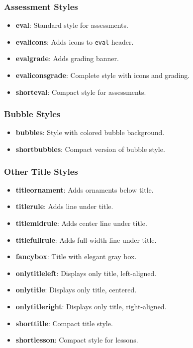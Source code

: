 \documentclass[
    margin=2cm
]{neoschool}
\begin{document}
\subsubsection{Assessment Styles}

\begin{itemize}
\item
  \textbf{eval}: Standard style for assessments.
\end{itemize}


\begin{itemize}
\item
  \textbf{evalicons}: Adds icons to \texttt{eval}
  header.
\item
  \textbf{evalgrade}: Adds grading banner.
\item
  \textbf{evaliconsgrade}: Complete style with icons and grading.
\item
  \textbf{shorteval}: Compact style for assessments.
\end{itemize}

\subsubsection{Bubble Styles}

\begin{itemize}
\item
  \textbf{bubbles}: Style with colored bubble background.
\item
  \textbf{shortbubbles}: Compact version of bubble style.
\end{itemize}

\subsubsection{Other Title Styles}

\begin{itemize}
\item
  \textbf{titleornament}: Adds ornaments below title.
\item
  \textbf{titlerule}: Adds line under title.
\item
  \textbf{titlemidrule}: Adds center line under title.
\item
  \textbf{titlefullrule}: Adds full-width line under title.
\item
  \textbf{fancybox}: Title with elegant gray box.
\item
  \textbf{onlytitleleft}: Displays only title, left-aligned.
\item
  \textbf{onlytitle}: Displays only title, centered.
\item
  \textbf{onlytitleright}: Displays only title, right-aligned.
\item
  \textbf{shorttitle}: Compact title style.
\item
  \textbf{shortlesson}: Compact style for lessons.
\end{itemize}
\end{document}
